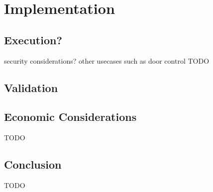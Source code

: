 \chapter{Implementation}
\label{chap:impl}

\section{Execution?}

security considerations?
other usecases such as door control
TODO

\section{Validation}

\section{Economic Considerations}

TODO

\section{Conclusion}

TODO